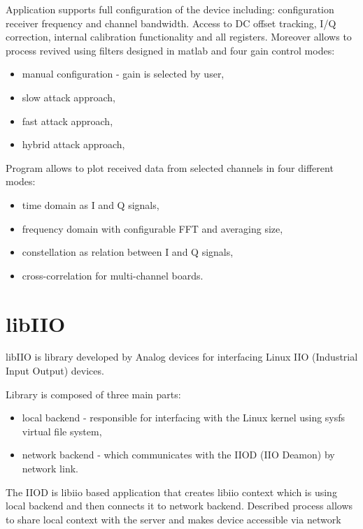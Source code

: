\documentclass[en,printmode]{mgr}
\begin{document}
			Application supports full configuration of the device including: configuration receiver
			frequency and channel bandwidth. Access to DC offset tracking, I/Q correction,
			internal calibration functionality and all registers. Moreover allows to process revived
			using filters designed in matlab and four gain control modes:
			\begin{itemize}
				\item manual configuration - gain is selected by user,
				\item slow attack approach,
				\item fast attack approach,
				\item hybrid attack approach,
				
			\end{itemize}
			\vspace{5mm}
							
			\noindent
			Program allows to plot received data from selected channels in four different modes:
			\begin{itemize}
				\item time domain as I and Q signals,
				\item frequency domain with configurable FFT and averaging size,
				\item constellation as relation between I and Q signals,
				\item cross-correlation for multi-channel boards.
			\end{itemize}
			
	\section{libIIO}
		libIIO is library developed by Analog devices for interfacing Linux IIO (Industrial
		Input Output) devices.
		
		Library is composed of three main parts:
		\begin{itemize}
			\item local backend - responsible for  interfacing with the Linux kernel using
				sysfs virtual file system,
			\item network backend - which communicates with the IIOD (IIO Deamon) by network link.	
		\end{itemize}
		
		The IIOD is libiio based application that creates libiio context which is using local backend
		and then connects it to network backend. Described process allows to share local context
		with the server and makes device accessible via network
\end{document}
